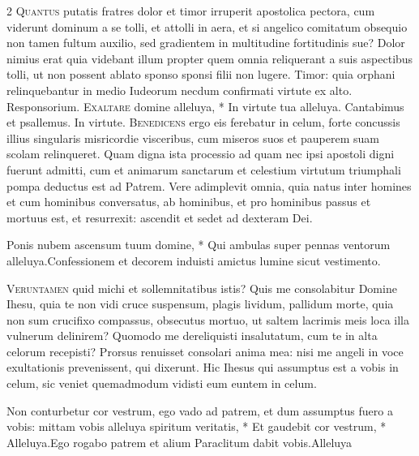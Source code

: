 \begin{multicols*}{2}
\lettrine[lines=2]{\zallmancaps \color{Red} Q}{uantus} putatis fratres dolor et timor irruperit apostolica pectora, cum viderunt dominum a se tolli, et attolli in aera, et si angelico comitatum obsequio non tamen fultum auxilio, sed gradientem in multitudine fortitudinis sue? Dolor nimius erat quia videbant illum propter quem omnia reliquerant a suis aspectibus tolli, ut non possent ablato sponso sponsi filii non lugere. Timor: quia orphani relinquebantur in medio Iudeorum necdum confirmati virtute ex alto. {\color{Red} Responsorium.}
\lettrine[lines=2]{\zallmancaps \color{Blue} E}{xaltare} \hypertarget{exaltare-domine}{\label{exaltare-domine}} domine alleluya, * In virtute tua alleluya. \V Cantabimus et psallemus. In virtute.
\lettrine[lines=2]{\zallmancaps \color{Red} B}{enedicens} ergo eis ferebatur in celum, forte concussis illius singularis misricordie visceribus, cum miseros suos et pauperem suam scolam relinqueret. Quam digna ista processio ad quam nec ipsi apostoli digni fuerunt admitti, cum et animarum sanctarum et celestium virtutum triumphali pompa deductus est ad Patrem. Vere adimplevit omnia, quia natus inter homines et cum hominibus conversatus, ab hominibus, et pro hominibus passus et mortuus est, et resurrexit: ascendit et sedet ad dexteram Dei.
\begin{responsory}
{Ponis nubem ascensum tuum domine, * Qui ambulas super pennas ventorum alleluya.}{Confessionem et decorem induisti amictus lumine sicut vestimento.}
\end{responsory}%
\lettrine[lines=2]{\zallmancaps \color{Blue} V}{eruntamen} quid michi et sollemnitatibus istis? Quis me consolabitur Domine Ihesu, quia te non vidi cruce suspensum, plagis lividum, pallidum morte, quia non sum crucifixo compassus, obsecutus mortuo, ut saltem lacrimis meis loca illa vulnerum delinirem? Quomodo me dereliquisti insalutatum, cum te in alta celorum recepisti? Prorsus renuisset consolari anima mea: nisi me angeli in voce exultationis prevenissent, qui dixerunt. Hic Ihesus qui assumptus est a vobis in celum, sic veniet quemadmodum vidisti eum euntem in celum.
\begin{responsory-final}
{Non conturbetur cor vestrum, ego vado ad patrem, et dum assumptus fuero a vobis: mittam vobis alleluya spiritum veritatis, * Et gaudebit cor vestrum, * Alleluya.}{Ego rogabo patrem et alium Paraclitum dabit vobis.}{Alleluya}

\end{responsory-final}
\end{multicols*}
